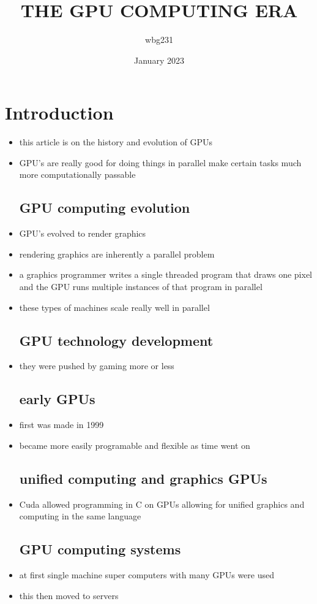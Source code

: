 \documentclass{article}
\title{THE GPU COMPUTING ERA }
\author{wbg231 }
\date{January 2023}
\begin{document}
\maketitle

\section{Introduction}
\begin{itemize}
\item this article is on the history and evolution of GPUs
\item GPU's are really good for doing things in parallel make certain tasks much more computationally passable 
\subsection*{GPU computing evolution}
\item GPU's evolved to render graphics 
\item rendering graphics are inherently a parallel problem
\item a graphics programmer writes a single threaded program that draws one pixel and the GPU runs multiple instances of that program in parallel
\item these types of machines scale really well in parallel
\subsection*{GPU technology development }
\item they were pushed by gaming more or less
\subsection*{early GPUs}
\item first was made in 1999 
\item became more easily programable and flexible as time went on 
\subsection*{unified computing and graphics GPUs}
\item Cuda allowed programming in C on GPUs allowing for unified graphics and computing in the same language 
\subsection*{GPU computing systems}
\item at first single machine super computers with many GPUs were used 
\item this then moved to servers 

\end{itemize}
\end{document}
